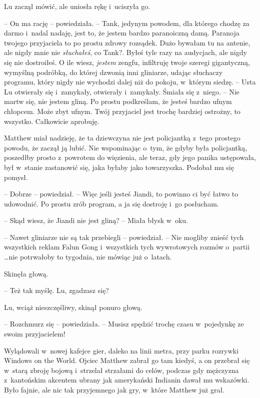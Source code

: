 \documentclass[oneside,polish,11pt,rmheadings]{mwbk}
\begin{document}
Lu zaczął mówić, ale uniosła rękę i~uciszyła go. 

-- On ma rację -- powiedziała. -- Tank, jedynym powodem, dla którego chodzę za darmo i~nadal nadaję, jest to, że jestem bardzo paranoiczną damą. Paranoja twojego przyjaciela to po prostu zdrowy rozsądek. Dużo bywałam tu na antenie, ale nigdy mnie nie \textit{słuchałeś}, co Tank?. Byłeś tyle razy na audycjach, ale nigdy się nie dostroiłeś. O ile wiesz, \textit{jestem }zengfu, infiltruję twoje szeregi gigantyczną, wymyślną podróbką, do której dzwonią inni gliniarze, udając słuchaczy programu, który nigdy nie wychodzi dalej niż do pokoju, w~którym siedzę. -- Usta Lu otwierały się i~zamykały, otwierały i~zamykały. Śmiała się z~niego. -- Nie martw się, nie jestem gliną. Po prostu podkreślam, że jesteś bardzo ufnym chłopcem. Może zbyt ufnym. Twój przyjaciel jest trochę bardziej ostrożny, to wszystko. Całkowicie aprobuję. 

Matthew miał nadzieję, że ta dziewczyna nie jest policjantką z~tego prostego powodu, że zaczął ją lubić. Nie wspominając o~tym, że gdyby była policjantką, poszedłby prosto z~powrotem do więzienia, ale teraz, gdy jego panika ustępowała, był w~stanie zastanowić się, jaka byłaby jako towarzyszka. Podobał mu się pomysł.

-- Dobrze -- powiedział. -- Więc jeśli jesteś Jiandi, to powinno ci być łatwo to udowodnić. Po prostu zrób program, a ja się dostroję i~go posłucham. 

-- Skąd wiesz, że Jiandi nie jest gliną? -- Miała błysk w~oku.

-- Nawet gliniarze nie są tak przebiegli -- powiedział. -- Nie mogliby znieść tych wszystkich reklam Falun Gong i~wszystkich tych wywrotowych rozmów o~partii  \ldots  nie potrwałoby to tygodnia, nie mówiąc już o~latach.

Skinęła głową. 

-- Też tak myślę. Lu, zgadzasz się?

Lu, wciąż nieszczęśliwy, skinął ponuro głową.

-- Rozchmurz się -- powiedziała. -- Musisz spędzić trochę czasu w~pojedynkę ze swoim przyjacielem!

Wylądowali w~nowej kafejce gier, daleko na linii metra, przy parku rozrywki Windows on the World. Ojciec Matthew zabrał go tam kiedyś, a on przebrał się w~starą zbroję bojową i~strzelał strzałami do celów, podczas gdy mężczyzna z~kantońskim akcentem ubrany jak amerykański Indianin dawał mu wskazówki. Było fajnie, ale nic tak przyjemnego jak gry, w~które Matthew już grał.
\end{document}
